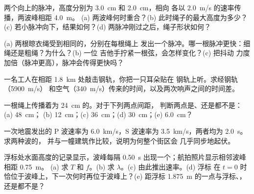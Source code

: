\begin{exercise}[$\star\star$]\label{exo:g12:mechanical-waves:7}
两个向上的脉冲，高度分别为 \qty{3.0}{cm} 和 \qty{2.0}{cm}，相向
各以 \qty{2.0}{m/s} 的速率传播，两波峰相距 \qty{4.0}{m}。
(a) 两波峰何时重合？(b) 此时绳子的最大高度为多少？
(c) 若小脉冲向下，结果如何？(d) 两脉冲刚过之后，绳子形状如何？
\end{exercise}

\begin{exercise}[$\star\star$]\label{exo:g12:mechanical-waves:8}
(a) 两根晾衣绳受到相同的，分别在每根绳上
发出一个脉冲。哪一根脉冲更快：细绳还是粗绳？为什么？(b) 一位
吉他手拧紧一根弦，会怎样变化？(c) 把抖动
力度加倍（脉冲更高），脉冲会传得更快吗？
\end{exercise}

\begin{exercise}[$\star\star$]\label{exo:g12:mechanical-waves:9}
一名工人在相距 \qty{1.8}{km} 处敲击钢轨，你把一只耳朵贴在
钢轨上听。求经钢轨（\qty{5900}{m/s}）
和空气（\qty{340}{m/s}）传来的时间，以及两次响声之间的时间差。
\end{exercise}

\begin{exercise}[$\star\star$]\label{exo:g12:mechanical-waves:10}
一根绳上传播着为 \qty{24}{cm} 的。对于下列两点间距，
判断两点是、还是都不是：(a) \qty{48}{cm}；
(b) \qty{12}{cm}；(c) \qty{36}{cm}；(d) \qty{30}{cm}；(e) \qty{6.0}{cm}？
\end{exercise}

\begin{exercise}[$\star\star$]\label{exo:g12:mechanical-waves:11}
一次地震发出的 P 波速率为 \qty{6.0}{km/s}，S 波速率为
\qty{3.5}{km/s}，两者均为 \qty{2.0}{s}。求两种波的，
并与一幢建筑作比较，说明为何整个街区会
几乎同步地起伏。
\end{exercise}

\begin{exercise}[$\star\star\star$]\label{exo:g12:mechanical-waves:12}
浮标处水面高度的记录显示，波峰每隔
\qty{0.50}{s} 出现一个；航拍照片显示相邻波峰相距 \qty{0.75}{m}。
(a) 求 $T$ 和 $f$。(b) 求 $\lambda$。(c) 由此推出速率。(d) 浮标
在 $t = 0$ 时恰位于波峰上，下一次何时再位于波峰上？(e) 距浮标 \qty{1.875}{m}
的一点与浮标、，还是都不是？
\end{exercise}

